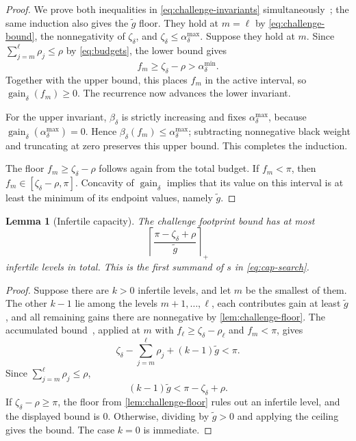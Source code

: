 \documentclass[11pt]{article}
\theoremstyle{plain}
\newtheorem{lemma}{Lemma}
\theoremstyle{remark}
\newcommand{\gaind}{\operatorname{gain}_{\delta}}
\newcommand{\gtilde}{\widetilde g}
\newcommand{\spend}[2]{\sum_{j=#1}^{#2}\rho_j}
\begin{document}
\begin{proof}
We prove both inequalities in \eqref{eq:challenge-invariants}
simultaneously~\cite[Claims 4 and 5]{FOCS:Reyzin24}; the same induction also gives the
\(\gtilde\) floor.  They hold at \(m=\ell\) by \eqref{eq:challenge-bound}, the
nonnegativity of \(\zeta_\delta\), and
\(\zeta_\delta\le\alpha_\delta^{\max}\).  Suppose they hold at \(m\).  Since
\(\spend{m}{\ell}\le\rho\) by \eqref{eq:budgets}, the lower bound gives
\[
 f_m\ge\zeta_\delta-\rho>\alpha_\delta^{\min}.
\]
Together with the upper bound, this places \(f_m\) in the active interval, so
\(\gaind(f_m)\ge0\).  The recurrence now advances the lower invariant.

For the upper invariant, \(\beta_\delta\) is strictly increasing and fixes
\(\alpha_\delta^{\max}\), because
\(\gaind(\alpha_\delta^{\max})=0\).  Hence
\(\beta_\delta(f_m)\le\alpha_\delta^{\max}\); subtracting nonnegative black weight
and truncating at zero preserves this upper bound.  This completes the induction.

The floor \(f_m\ge\zeta_\delta-\rho\) follows again from the total budget.  If
\(f_m<\pi\), then \(f_m\in[\zeta_\delta-\rho,\pi]\).  Concavity of
\(\gaind\) implies that its value on this interval is at least the minimum of
its endpoint values, namely \(\gtilde\).
\end{proof}

\begin{lemma}[Infertile capacity]
\label{lem:infertile-capacity}
The challenge footprint bound has at most
\[
 \left\lceil\frac{\pi-\zeta_\delta+\rho}{\gtilde}\right\rceil_+
\]
infertile levels in total.  This is the first summand of \(s\) in
\eqref{eq:cap-search}.
\end{lemma}

\begin{proof}
Suppose there are \(k>0\) infertile levels, and let \(m\) be the smallest of them.
The other \(k-1\) lie among the levels \(m+1,\ldots,\ell\), each contributes gain
at least \(\gtilde\), and all remaining gains there are nonnegative by
\cref{lem:challenge-floor}.  The accumulated bound~\cite[Claim 3]{FOCS:Reyzin24},
applied at \(m\) with \(f_\ell\ge\zeta_\delta-\rho_\ell\) and \(f_m<\pi\), gives
\[
 \zeta_\delta-\spend{m}{\ell}+(k-1)\gtilde<\pi.
\]
Since \(\spend{m}{\ell}\le\rho\),
\[
 (k-1)\gtilde<\pi-\zeta_\delta+\rho.
\]
If \(\zeta_\delta-\rho\ge\pi\), the floor from
\cref{lem:challenge-floor} rules out an infertile level, and the displayed bound is
\(0\).  Otherwise, dividing by \(\gtilde>0\) and applying the ceiling gives the
bound.  The case \(k=0\) is immediate.
\end{proof}
\end{document}
